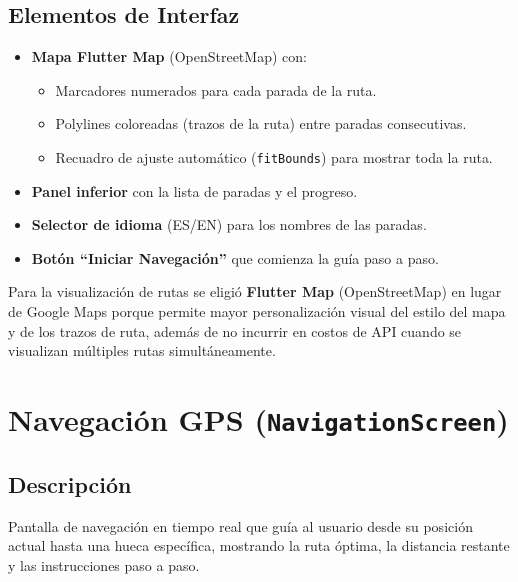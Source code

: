 \documentclass[11pt, a4paper, oneside]{report}
\begin{document}
\subsection{Elementos de Interfaz}
\begin{itemize}
  \item \textbf{Mapa Flutter Map} (OpenStreetMap) con:
  \begin{itemize}
    \item Marcadores numerados para cada parada de la ruta.
    \item Polylines coloreadas (trazos de la ruta) entre paradas consecutivas.
    \item Recuadro de ajuste automático (\texttt{fitBounds}) para mostrar toda la ruta.
  \end{itemize}
  \item \textbf{Panel inferior} con la lista de paradas y el progreso.
  \item \textbf{Selector de idioma} (ES/EN) para los nombres de las paradas.
  \item \textbf{Botón ``Iniciar Navegación''} que comienza la guía paso a paso.
\end{itemize}

\begin{decisionbox}
  Para la visualización de rutas se eligió \textbf{Flutter Map} (OpenStreetMap) en lugar de Google Maps porque permite mayor personalización visual del estilo del mapa y de los trazos de ruta, además de no incurrir en costos de API cuando se visualizan múltiples rutas simultáneamente.
\end{decisionbox}

\section{Navegación GPS (\texttt{NavigationScreen})}

\subsection{Descripción}
Pantalla de navegación en tiempo real que guía al usuario desde su posición actual hasta una hueca específica, mostrando la ruta óptima, la distancia restante y las instrucciones paso a paso.
\end{document}
